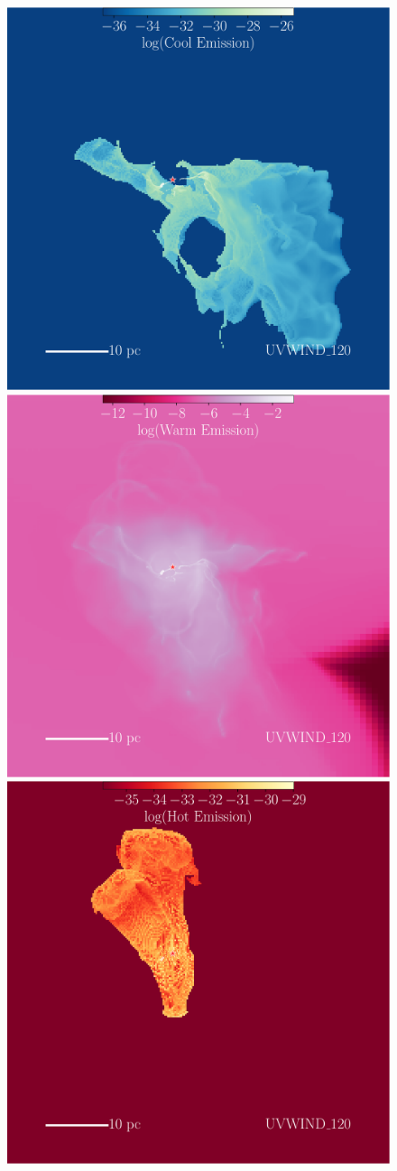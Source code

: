 \documentclass[a4paper,fleqn,usenatbib]{mnras}
\begin{document}
\begin{figure}
	\centerline{\includegraphics[width=0.66\columnwidth]{../plots/vis/multiray/multirayTime_coolemission_windset_120Msun0p2Myr_zoom0p5__ywindonly.pdf} \includegraphics[width=0.66\columnwidth]{../plots/vis/multiray/multirayTime_ionemission_windset_120Msun0p2Myr_zoom0p5__ywindonly.pdf}
	\includegraphics[width=0.66\columnwidth]{../plots/vis/multiray/multirayTime_xrayemission2_windset_120Msun0p2Myr_zoom0p5__ywindonly.pdf}}

\end{figure}
\end{document}
